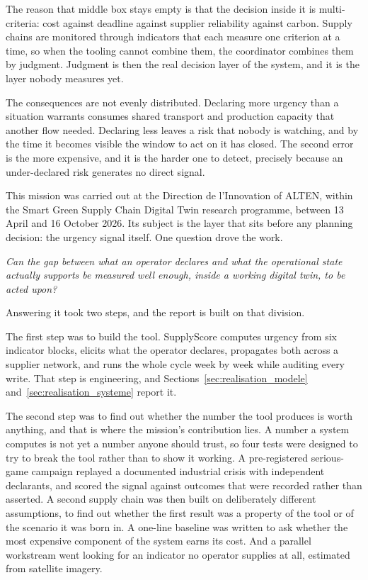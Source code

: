 The reason that middle box stays empty is that the decision inside it is multi-criteria: cost
against deadline against supplier reliability against carbon. Supply chains are monitored
through indicators that each measure one criterion at a time, so when the tooling cannot
combine them, the coordinator combines them by judgment. Judgment is then the real decision
layer of the system, and it is the layer nobody measures yet.

The consequences are not evenly distributed. Declaring more urgency than a situation
warrants consumes shared transport and production capacity that another flow needed.
Declaring less leaves a risk that nobody is watching, and by the time it becomes visible the
window to act on it has closed. The second error is the more expensive, and it is the harder
one to detect, precisely because an under-declared risk generates no direct signal.

This mission was carried out at the Direction de l'Innovation of ALTEN, within the Smart
Green Supply Chain Digital Twin research programme, between 13 April and 16 October 2026.
Its subject is the layer that sits before any planning decision: the urgency signal itself.
One question drove the work.

\begin{definitionBox}
\noindent\emph{Can the gap between what an operator declares and what the operational state
actually supports be measured well enough, inside a working digital twin, to be acted upon?}
\end{definitionBox}

Answering it took two steps, and the report is built on that division.

The first step was to build the tool. SupplyScore computes urgency from six indicator blocks,
elicits what the operator declares, propagates both across a supplier network, and runs the
whole cycle week by week while auditing every write. That step is engineering, and
Sections~\ref{sec:realisation_modele} and~\ref{sec:realisation_systeme} report it.

The second step was to find out whether the number the tool produces is worth anything, and
that is where the mission's contribution lies. A number a system computes is not yet a number
anyone should trust, so four tests were designed to try to break the tool rather than to show
it working. A pre-registered serious-game campaign replayed a documented industrial crisis
with independent declarants, and scored the signal against outcomes that were recorded rather
than asserted. A second supply chain was then built on deliberately different assumptions, to
find out whether the first result was a property of the tool or of the scenario it was born
in. A one-line baseline was written to ask whether the most expensive component of the system
earns its cost. And a parallel workstream went looking for an indicator no operator supplies
at all, estimated from satellite imagery.

